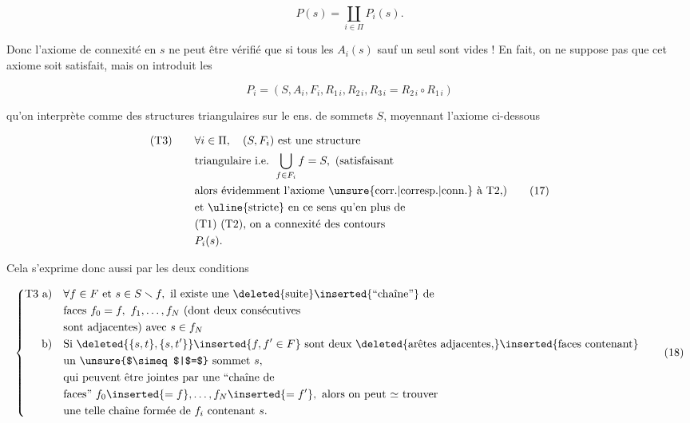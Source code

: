 \[
P(s)=\coprod_{i\in\Pi}P_i(s).\tag*{(15)}
\]

Donc l'axiome de connexité en $s$ ne peut être vérifié que si tous les $A_i(s)$ sauf un seul sont vides !  En fait, on ne suppose pas que cet axiome soit satisfait, mais on introduit les

\[
P_i=(S,A_i,F_i,R_{1\,i},R_{2\,i},R_{3\,i}=R_{2\,i}\circ R_{1\,i})\tag*{(16)}
\]

qu'on interprète comme des structures triangulaires sur le \unsure{$\simeq$|$=$} ens. de sommets $S$, moyennant l'axiome ci-dessous

\[
\begin{aligned}
 (\mathrm{T3})\qquad&\forall i\in\Pi,\quad(S,F_i)\text{ est une structure}\\
 &\text{triangulaire i.e. }\bigcup_{f\in F_i}f=S,\ \text{(satisfaisant}\\
 &\text{alors évidemment l'axiome \unsure{corr.|corresp.|conn.} à T2,)}\\
 &\text{et \uline{stricte} en ce sens qu'en plus de}\\
 &\text{(T1) (T2), on a connexité des contours}\\
 &P_i(s).
\end{aligned}\tag*{(17)}
\]

Cela s'exprime donc aussi par les deux conditions

\[
\left\{\begin{aligned}
 \mathrm{T3}\ \text{a)}\quad &\forall f\in F\text{ et }s\in S\smallsetminus f,\ \text{il existe une \deleted{suite}\inserted{``chaîne''} de}\\
 &\text{faces }f_0=f,\ f_1,\ldots,f_N\ \text{(dont deux consécutives}\\
 &\text{sont adjacentes) avec }s\in f_N\\
 \text{b)}\quad &\text{Si }\deleted{\{s,t\},\{s,t'\}}\inserted{f,f'\in F}\text{ sont deux \deleted{arêtes adjacentes,}\inserted{faces contenant}}\\
 &\text{un \unsure{$\simeq$|$=$} sommet }s,\\
 &\text{qui peuvent être jointes par une ``chaîne de}\\
 &\text{faces''\ }f_0\inserted{=f},\ldots,f_N\inserted{=f'},\ \text{alors on peut $\simeq$ trouver}\\
 &\text{une telle chaîne formée de }f_i\text{ contenant }s.
\end{aligned}\right.\tag*{(18)}
\]

